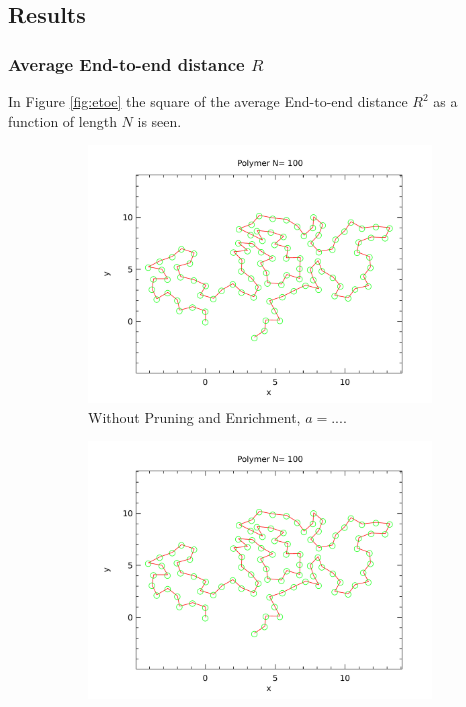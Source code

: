 \subsection*{Results}
\subsubsection*{Average End-to-end distance $R$}

In Figure \ref{fig:etoe} the square of the average End-to-end distance $R^2$ as a function of length $N$ is seen.

\begin{figure}[htb]
        \centering
        \begin{subfigure}[b]{0.45\textwidth}
                \centering
                \includegraphics[width=\textwidth]{voorblad.pdf}
                \caption{Without Pruning and Enrichment, $a= ...$.}
                \label{fig:etoe_noprem}
        \end{subfigure}
	\quad
        \begin{subfigure}[b]{0.45\textwidth}
                \centering
                \includegraphics[width=\textwidth]{voorblad.pdf}

\end{subfigure}
\end{figure}
